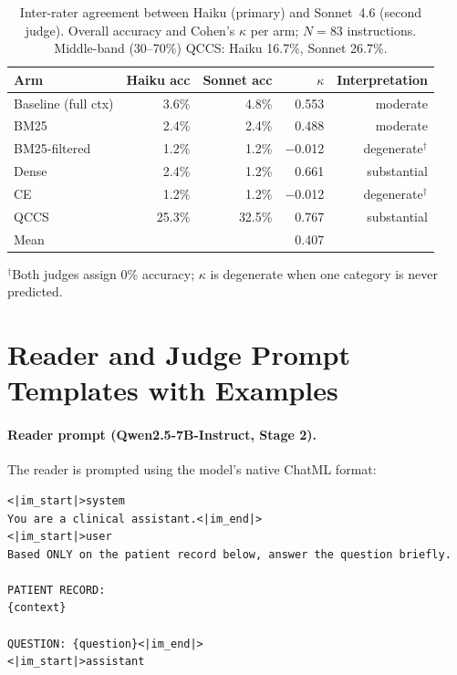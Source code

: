 \documentclass{article}
\begin{document}
\begin{table}[H]
\centering
\caption{Inter-rater agreement between Haiku (primary) and Sonnet~4.6 (second judge).
  Overall accuracy and Cohen's $\kappa$ per arm; $N{=}83$ instructions.
  Middle-band (30--70\%) QCCS: Haiku 16.7\%, Sonnet 26.7\%.}
\label{tab:kappa}
\small
\begin{tabular}{@{}lrrrr@{}}
\toprule
Arm & Haiku acc & Sonnet acc & $\kappa$ & Interpretation \\
\midrule
Baseline (full ctx) & 3.6\% & 4.8\% & 0.553 & moderate \\
BM25           & 2.4\% & 2.4\% & 0.488 & moderate \\
BM25-filtered  & 1.2\% & 1.2\% & $-$0.012 & degenerate$^\dagger$ \\
Dense          & 2.4\% & 1.2\% & 0.661 & substantial \\
CE             & 1.2\% & 1.2\% & $-$0.012 & degenerate$^\dagger$ \\
QCCS           & 25.3\% & 32.5\% & 0.767 & substantial \\
\midrule
Mean & & & 0.407 & \\
\bottomrule
\end{tabular}
\end{table}

$^\dagger$Both judges assign 0\% accuracy; $\kappa$ is degenerate when one
category is never predicted.


\section{Reader and Judge Prompt Templates with Examples}
\label{app:prompts}

\paragraph{Reader prompt (Qwen2.5-7B-Instruct, Stage 2).}
The reader is prompted using the model's native ChatML format:

\begin{verbatim}
<|im_start|>system
You are a clinical assistant.<|im_end|>
<|im_start|>user
Based ONLY on the patient record below, answer the question briefly.

PATIENT RECORD:
{context}

QUESTION: {question}<|im_end|>
<|im_start|>assistant
\end{verbatim}
\end{document}
